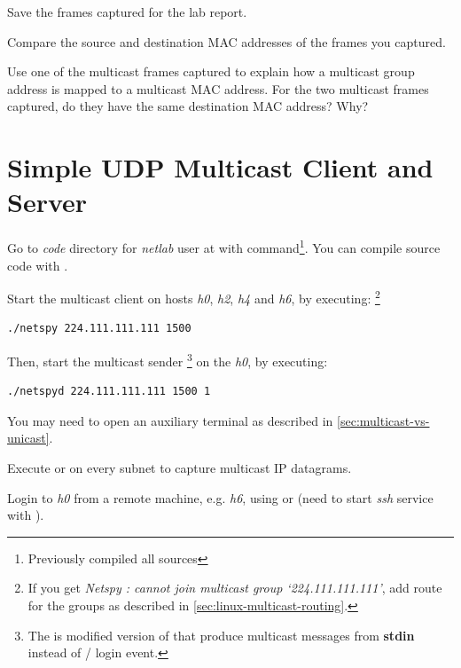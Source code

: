 \documentclass{../UTNetLab}
\begin{document}
Save the frames captured for the lab report.

\begin{report}
    \item Compare the source and destination MAC addresses of the frames you captured.

    \item Use one of the multicast frames captured to explain how a multicast group address is mapped to a multicast MAC address.
    For the two multicast frames captured, do they have the same destination MAC address?
    Why?
\end{report}

\section{Simple UDP Multicast Client and Server}
Go to \textit{code} directory for \textit{netlab} user at  with  command\footnote{Previously compiled all sources}.
You can compile source code with .


Start the multicast client  on hosts \textit{h0}, \textit{h2}, \textit{h4} and \textit{h6}, by executing:%
\footnote{If you get \textit{Netspy : cannot join multicast group `224.111.111.111'}, add route for the groups as described in \autoref{sec:linux-multicast-routing}.}

\begin{lstlisting}
./netspy 224.111.111.111 1500
\end{lstlisting}

Then, start the multicast sender \footnote{The  is modified version of  that produce multicast messages from \textbf{stdin} instead of / login event.} on the \textit{h0}, by executing:

\begin{lstlisting}
./netspyd 224.111.111.111 1500 1
\end{lstlisting}
You may need to open an auxiliary terminal as described in \autoref{sec:multicast-vs-unicast}.

Execute  or  on every subnet to capture multicast IP datagrams.

Login to \textit{h0} from a remote machine, e.g. \textit{h6}, using  or  (need to start \textit{ssh} service with ).
\end{document}
